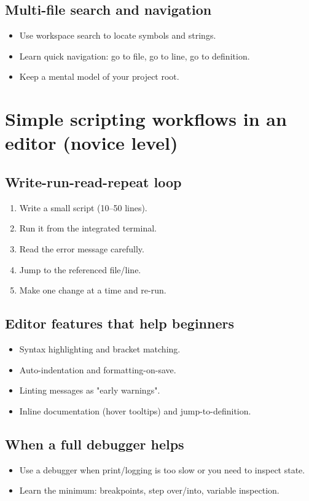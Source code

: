 \subsection{Multi-file search and navigation}
\begin{itemize}
\item Use workspace search to locate symbols and strings.
\item Learn quick navigation: go to file, go to line, go to definition.
\item Keep a mental model of your project root.
\end{itemize}

\section{Simple scripting workflows in an editor (novice level)}
\subsection{Write-run-read-repeat loop}
\begin{enumerate}
\item Write a small script (10--50 lines).
\item Run it from the integrated terminal.
\item Read the error message carefully.
\item Jump to the referenced file/line.
\item Make one change at a time and re-run.
\end{enumerate}

\subsection{Editor features that help beginners}
\begin{itemize}
\item Syntax highlighting and bracket matching.
\item Auto-indentation and formatting-on-save.
\item Linting messages as "early warnings".
\item Inline documentation (hover tooltips) and jump-to-definition.
\end{itemize}

\subsection{When a full debugger helps}
\begin{itemize}
\item Use a debugger when print/logging is too slow or you need to inspect state.
\item Learn the minimum: breakpoints, step over/into, variable inspection.
\end{itemize}

